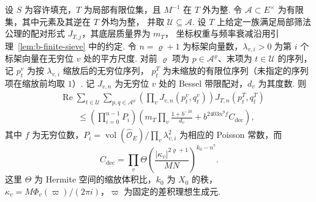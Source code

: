 \begin{lemma}
\label{lem:b-poisson-sieve}
\emitthmsource
设 $S$ 为容许填充，$T$ 为局部有限位集，且 $M^{-1}$ 在 $T$ 外为整.
令 $\mathcal A\subset E^\times$ 为有限集，其中元素及其逆在 $T$ 外均为整，
并取 $\mathcal U\subseteq\mathcal A$.
设 $T$ 上给定一族满足局部筛法公理的配对形式 $J_{T,j}$，其底层质量界为 $m_T$，
坐标权重与频率衰减沿用引理~\ref{lem:b-finite-sieve} 中的约定.
令 $n=\varrho+1$ 为标架向量数，$\lambda_{v,i}>0$ 为第 $i$ 个标架向量在无穷位 $v$
处的平方尺度. 对前 $\varrho$ 项为 $p\in\mathcal A^\varrho$、末项为 $t\in\mathcal U$
的序列，记 $p^v_t$ 为按 $\lambda_{v,i}$ 缩放后的无穷位序列，
$p^T_t$ 为未缩放的有限位序列（未指定的序列项在缩放前均取 $1$）.
记 $J_{v,n}$ 为无穷位 $v$ 处的 Bessel 带限配对，$d_v$ 为其度数.
则
\[
 \begin{aligned}
 &\operatorname{Re}\sum_{t\in\mathcal U}
      \sum_{p,q\in\mathcal A^\varrho}
      \left(\prod_v J_{v,n}(p^v_t,q^v_t)\right)J_{T,n}(p^T_t,q^T_t)\\
 &\qquad\le
 \left(\prod_{i=0}^{n-1} P_i\right)
 \left(m_T\prod_v\frac{1+b^{-10}}{d_v}
                 +b^{2403n^9f}C_{\mathrm{dec}}\right),
 \end{aligned}
\]
其中 $f$ 为无穷位数，$P_i=\operatorname{vol}(\widehat{\mathcal O}_E)/\prod_v\lambda_{v,i}^2$
为相应的 Poisson 常数，而
\[
 C_{\mathrm{dec}}=\prod_v \Theta\left(
      \frac{|\kappa_v|^{2\varrho+1}}{MN}\right)^{k_0-n^7}.
\]
这里 $\Theta$ 为 Hermite 空间的缩放体积比，$k_0$ 为 $X_0$ 的秩，
$\kappa_v=M\Phi_v(\varpi)/(2\pi i)$，$\varpi$ 为固定的差积理想生成元.
\end{lemma}
